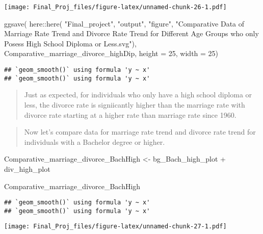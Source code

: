 \documentclass[
]{article}
\newenvironment{Shaded}{\begin{snugshade}}{\end{snugshade}}
\newcommand{\AttributeTok}[1]{\textcolor[rgb]{0.77,0.63,0.00}{#1}}
\newcommand{\DecValTok}[1]{\textcolor[rgb]{0.00,0.00,0.81}{#1}}
\newcommand{\FunctionTok}[1]{\textcolor[rgb]{0.00,0.00,0.00}{#1}}
\newcommand{\NormalTok}[1]{#1}
\newcommand{\OtherTok}[1]{\textcolor[rgb]{0.56,0.35,0.01}{#1}}
\newcommand{\SpecialCharTok}[1]{\textcolor[rgb]{0.00,0.00,0.00}{#1}}
\newcommand{\StringTok}[1]{\textcolor[rgb]{0.31,0.60,0.02}{#1}}
\begin{document}
\texttt{[image: Final\_Proj\_files/figure-latex/unnamed-chunk-26-1.pdf]}

\begin{Shaded}
\begin{Highlighting}[]
\FunctionTok{ggsave}\NormalTok{(}
\NormalTok{  here}\SpecialCharTok{::}\FunctionTok{here}\NormalTok{(}
    \StringTok{"Final\_project"}\NormalTok{,}
    \StringTok{"output"}\NormalTok{,}
    \StringTok{"figure"}\NormalTok{,}
    \StringTok{"Comparative Data of Marriage Rate Trend and Divorce Rate Trend for Different Age Groups who only Posess High School Diploma or Less.svg"}\NormalTok{),}
\NormalTok{       Comparative\_marriage\_divorce\_highDip,}
       \AttributeTok{height =} \DecValTok{25}\NormalTok{,}
       \AttributeTok{width =} \DecValTok{25}\NormalTok{)}
\end{Highlighting}
\end{Shaded}

\begin{verbatim}
## `geom_smooth()` using formula 'y ~ x'
## `geom_smooth()` using formula 'y ~ x'
\end{verbatim}

\begin{quote}
Just as expected, for individuals who only have a high school diploma or
less, the divorce rate is signiicantly higher than the marriage rate
with divorce rate starting at a higher rate than marriage rate since
1960.
\end{quote}

\begin{quote}
Now let's compare data for marriage rate trend and divorce rate trend
for individuals with a Bachelor degree or higher.
\end{quote}

\begin{Shaded}
\begin{Highlighting}[]
\NormalTok{Comparative\_marriage\_divorce\_BachHigh }\OtherTok{\textless{}{-}}\NormalTok{ bg\_Bach\_high\_plot }\SpecialCharTok{+}\NormalTok{ div\_high\_plot}

\NormalTok{Comparative\_marriage\_divorce\_BachHigh}
\end{Highlighting}
\end{Shaded}

\begin{verbatim}
## `geom_smooth()` using formula 'y ~ x'
## `geom_smooth()` using formula 'y ~ x'
\end{verbatim}

\texttt{[image: Final\_Proj\_files/figure-latex/unnamed-chunk-27-1.pdf]}
\end{document}
